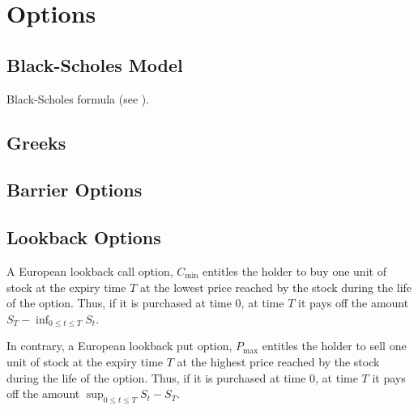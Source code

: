 \chapter{Options}

\section{Black-Scholes Model}

Black-Scholes formula (see \cite{Black_Scholes_1973}).

\section{Greeks}

\section{Barrier Options}

\cite{Carr_Bowie_1994}

\section{Lookback Options}

\cite{Carr_Bowie_1994}

\begin{definition}
A European lookback call option, $C_{\min}$ entitles the holder to buy one unit of stock at the expiry time $T$ at the lowest price reached by the stock during the life of the option. Thus, if it is purchased at time 0, at
time $T$ it pays off the amount $S_T - \inf_{0\leq t\leq T} S_t$.

In contrary, a European lookback put option, $P_{\max}$ entitles the holder to sell one unit of stock at the expiry time $T$ at the highest price reached by the stock during the life of the option. Thus, if it is purchased
at time 0, at time $T$ it pays off the amount $\sup_{0\leq t\leq T} S_t - S_T$.
\end{definition}

